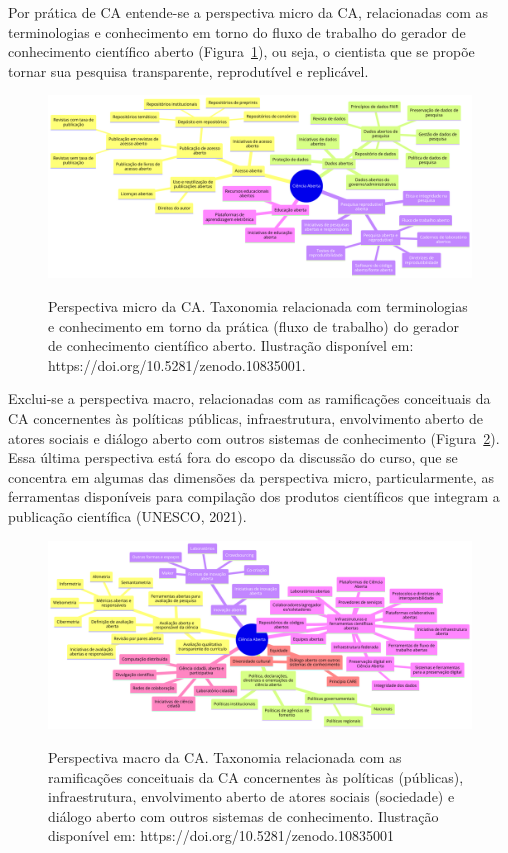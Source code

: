 \documentclass[
  a4paper,
]{article}
\begin{document}
Por prática de CA entende-se a perspectiva micro da CA, relacionadas com
as terminologias e conhecimento em torno do fluxo de trabalho do gerador
de conhecimento científico aberto (Figura~\ref{fig-ca-micro}), ou seja,
o cientista que se propõe tornar sua pesquisa transparente, reprodutível
e replicável.

\begin{figure}

\href{https://doi.org/10.5281/zenodo.10835001}{\includegraphics{img/ca-micro.png}}

\caption{\label{fig-ca-micro}Perspectiva micro da CA. Taxonomia
relacionada com terminologias e conhecimento em torno da prática (fluxo
de trabalho) do gerador de conhecimento científico aberto. Ilustração
disponível em: https://doi.org/10.5281/zenodo.10835001.}

\end{figure}%

Exclui-se a perspectiva macro, relacionadas com as ramificações
conceituais da CA concernentes às políticas públicas, infraestrutura,
envolvimento aberto de atores sociais e diálogo aberto com outros
sistemas de conhecimento (Figura~\ref{fig-ca-macro}). Essa última
perspectiva está fora do escopo da discussão do curso, que se concentra
em algumas das dimensões da perspectiva micro, particularmente, as
ferramentas disponíveis para compilação dos produtos científicos que
integram a publicação científica (UNESCO, 2021).

\begin{figure}

\href{https://doi.org/10.5281/zenodo.10835001}{\includegraphics{img/ca-macro.png}}

\caption{\label{fig-ca-macro}Perspectiva macro da CA. Taxonomia
relacionada com as ramificações conceituais da CA concernentes às
políticas (públicas), infraestrutura, envolvimento aberto de atores
sociais (sociedade) e diálogo aberto com outros sistemas de
conhecimento. Ilustração disponível em:
https://doi.org/10.5281/zenodo.10835001}

\end{figure}%
\end{document}
